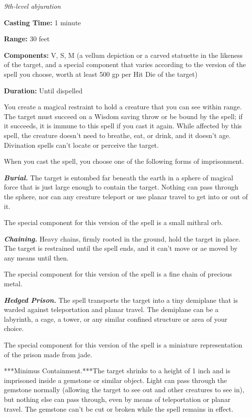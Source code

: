 \documentclass[
]{article}
\begin{document}
\emph{9th-level abjuration}

\textbf{Casting Time:} 1 minute

\textbf{Range:} 30 feet

\textbf{Components:} V, S, M (a vellum depiction or a carved statuette
in the likeness of the target, and a special component that varies
according to the version of the spell you choose, worth at least 500 gp
per Hit Die of the target)

\textbf{Duration:} Until dispelled

You create a magical restraint to hold a creature that you can see
within range. The target must succeed on a Wisdom saving throw or be
bound by the spell; if it succeeds, it is immune to this spell if you
cast it again. While affected by this spell, the creature doesn't need
to breathe, eat, or drink, and it doesn't age. Divination spells can't
locate or perceive the target.

When you cast the spell, you choose one of the following forms of
imprisonment.

\emph{\textbf{Burial.}} The target is entombed far beneath the earth in
a sphere of magical force that is just large enough to contain the
target. Nothing can pass through the sphere, nor can any creature
teleport or use planar travel to get into or out of it.

The special component for this version of the spell is a small mithral
orb.

\emph{\textbf{Chaining.}} Heavy chains, firmly rooted in the ground,
hold the target in place. The target is restrained until the spell ends,
and it can't move or ae moved by any means until then.

The special component for this version of the spell is a fine chain of
precious metal.

\emph{\textbf{Hedged Prison.}} The spell transports the target into a
tiny demiplane that is warded against teleportation and planar travel.
The demiplane can be a labyrinth, a cage, a tower, or any similar
confined structure or area of your choice.

The special component for this version of the spell is a miniature
representation of the prison made from jade.

***Minimus Containment.***The target shrinks to a height of 1 inch and
is imprisoned inside a gemstone or similar object. Light can pass
through the gemstone normally (allowing the target to see out and other
creatures to see in), but nothing else can pass through, even by means
of teleportation or planar travel. The gemstone can't be cut or broken
while the spell remains in effect.
\end{document}
